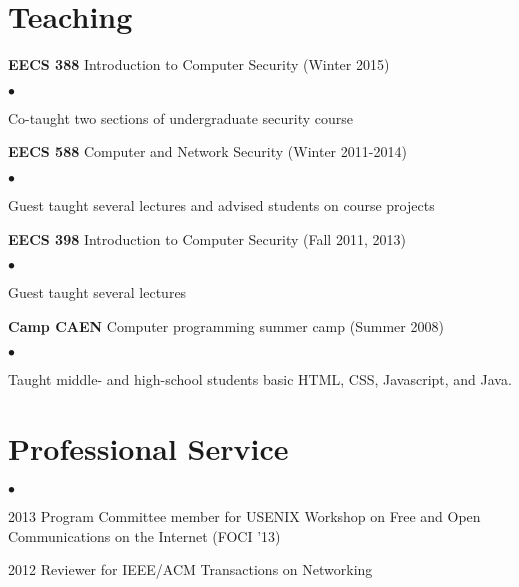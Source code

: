 \documentclass{res}
\newcommand{\sqitem}{\item[\tiny$\blacksquare$]}
\newcommand{\sqlist}{\begin{list}{$\bullet$}
  { \setlength{\itemsep}{0pt}
	\setlength{\parsep}{0pt}
	\setlength{\topsep}{0pt}
	\setlength{\partopsep}{0pt}
	\setlength{\leftmargin}{6.0em}
	\setlength{\labelsep}{2.5em} } }
\newcommand{\sqend}{\end{list}}
\begin{document}
\begin{resume}
\section{Teaching}
    \textbf{EECS 388} Introduction to Computer Security (Winter 2015)
        \sqlist
        \sqitem Co-taught two sections of undergraduate security course
        \sqend

    \textbf{EECS 588} Computer and Network Security (Winter 2011-2014)
        \sqlist
        \sqitem Guest taught several lectures and advised students on course projects
        \sqend

    \textbf{EECS 398} Introduction to Computer Security (Fall 2011, 2013)
        \sqlist
        \sqitem Guest taught several lectures
        \sqend

    \textbf{Camp CAEN} Computer programming summer camp (Summer 2008)
        \sqlist
        \sqitem Taught middle- and high-school students basic HTML, CSS, Javascript, and Java.
        \sqend

\section{Professional Service}
    \sqlist
    \sqitem 2013 Program Committee member for USENIX Workshop on Free and Open Communications on the Internet (FOCI '13)
    \sqitem 2012 Reviewer for IEEE/ACM Transactions on Networking
    \sqend


\end{resume}
\end{document}
